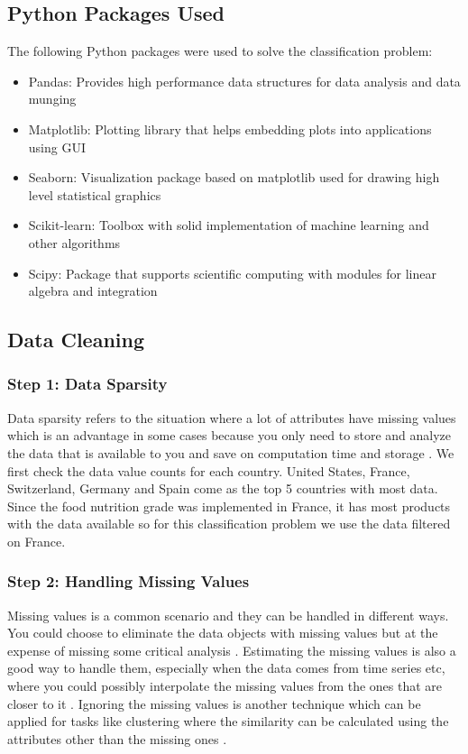 \documentclass[sigconf]{acmart}
\begin{document}
\subsection{Python Packages Used}
The following Python packages were used to solve the classification problem: \\
\begin{itemize}
	\item Pandas: Provides high performance data structures for data analysis and data munging
	\item Matplotlib: Plotting library that helps embedding plots into applications using GUI 
	\item Seaborn: Visualization package based on matplotlib used for drawing high level statistical graphics 
	\item Scikit-learn: Toolbox with solid implementation of machine learning and other algorithms
	\item Scipy: Package that supports scientific computing with modules for linear algebra and integration
\end{itemize}

\subsection{Data Cleaning}
\subsubsection{Step 1: Data Sparsity} 
Data sparsity refers to the situation where a lot of attributes have missing values which is an advantage in some cases because you only need to store and analyze the data that is available to you and save on computation time and storage \cite{book-tan}. We first check the data value counts for each country. United States, France, Switzerland, Germany and Spain come as the top 5 countries with most data. Since the food nutrition grade was implemented in France, it has most products with the data available so for this classification problem we use the data filtered on France.

\subsubsection{Step 2: Handling Missing Values}
Missing values is a common scenario and they can be handled in different ways. You could choose to eliminate the data objects with missing values but at the expense of missing some critical analysis \cite{book-tan}. Estimating the missing values is also a good way to handle them, especially when the data comes from time series etc, where you could possibly interpolate the missing values from the ones that are closer to it \cite{book-tan}. Ignoring the missing values is another technique which can be applied for tasks like clustering where the similarity can be calculated using the attributes other than the missing ones \cite{book-tan}. \\
\end{document}
